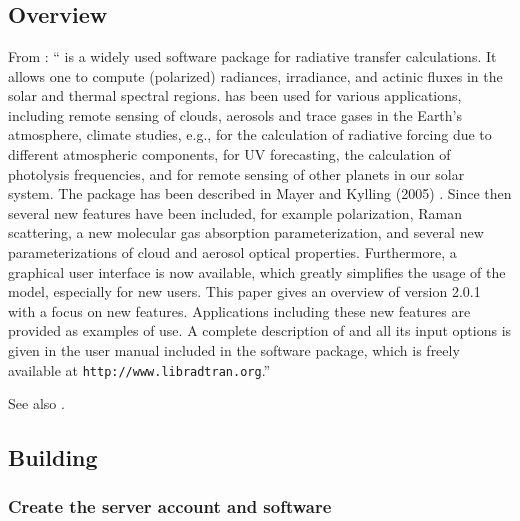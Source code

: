 

\chapter{\libradtran{}}
\label{chap:libRadtran}


\section{\libradtran{} Overview}

From \cite{EmdeLibRadtran2016}:
``
\libradtran{} is a widely used software package for
radiative transfer calculations. It allows one to compute (polarized) radiances, irradiance, and actinic fluxes in the solar and thermal spectral regions. \libradtran{} has been used
for various applications, including remote sensing of clouds,
aerosols and trace gases in the Earth’s atmosphere, climate
studies, e.g., for the calculation of radiative forcing due to
different atmospheric components, for UV forecasting, the
calculation of photolysis frequencies, and for remote sensing
of other planets in our solar system. The package has been
described in Mayer and Kylling (2005) \cite{libRadtran2005}. Since then several
new features have been included, for example polarization,
Raman scattering, a new molecular gas absorption parameterization, and several new parameterizations of cloud and
aerosol optical properties. Furthermore, a graphical user interface is now available, which greatly simplifies the usage
of the model, especially for new users. This paper gives an
overview of \libradtran{} version 2.0.1 with a focus on new features. Applications including these new features are provided
as examples of use. A complete description of \libradtran{} and
all its input options is given in the user manual included in
the \libradtran{} software package, which is freely available at
\lstinline{http://www.libradtran.org}.''

See also 
\cite{libRadtran2005,libRadTranUserGuide2012,libRadtranDownload2020,libRadtranmuenchen2020}.


\section{Building \libradtran{}}

\subsection{Create the server account and software}

